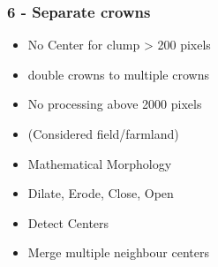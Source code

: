 \documentclass[aspectratio=169]{beamer}
\begin{document}
{
\begin{frame}[plain]
\end{frame}}


\begin{frame}
  \frametitle{6 - Separate crowns}
\begin{center}
\begin{itemize}
 \item No Center for clump > 200 pixels 
 \item double crowns to multiple crowns
 \item No processing above 2000 pixels
 \item (Considered field/farmland)
 \item Mathematical Morphology
 \item Dilate, Erode, Close, Open
 \item Detect Centers
 \item Merge multiple neighbour centers
\end{itemize}
\end{center}
\end{frame}

\end{document}
